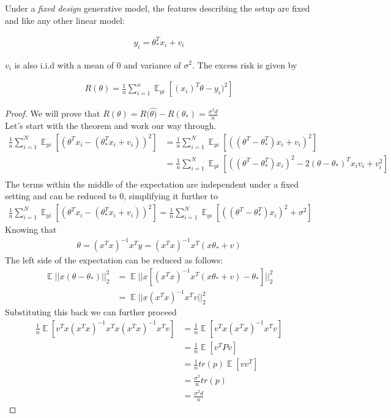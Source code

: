 Under a \textit{fixed design} generative model, the features describing the setup are fixed and like any other linear model:
\begin{theorem}
\begin{align*} 
y_{i} = \theta_{*}^{T}x_{i} + v_{i}
\end{align*}
\end{theorem}
$v_{i}$ is also i.i.d with a mean of $0$ and variance of $\sigma^{2}$. The excess risk is given by
\begin{theorem}
\begin{align*} 
R(\theta) = \frac{1}{n} \sum_{i=1}^{n}\mathop{{}\mathbb{E}}_{yi} [(x_{i})^{T}\theta - y_{i})^{2}]
\end{align*}
\end{theorem}
\begin{proof} We will prove that $R(\theta) = R(\hat{\theta)} - R(\theta_{*}) = \frac{\sigma^{2}d}{n}$ \\
Let's start with the theorem and work our way through. \\
\begin{align*}
\frac{1}{n}\sum_{i=1}^{N}\mathop{{}\mathbb{E}}_{yi}[(\theta^{T}x_{i} - (\theta_{*}^{T}x_{i}+v_{i}))^{2}] &= \frac{1}{n}\sum_{i=1}^{N}\mathop{{}\mathbb{E}}_{yi}[((\theta^{T} - \theta_{*}^{T})x_{i}+v_{i})^{2}] \\
&= \frac{1}{n}\sum_{i=1}^{N}\mathop{{}\mathbb{E}}_{yi}[((\theta^{T} - \theta_{*}^{T})x_{i})^{2}-2(\theta - \theta_{*})^{T}x_{i}v_{i}+v_{i}^{2}] \\
\end{align*}
The terms within the middle of the expectation are independent under a fixed setting and can be reduced to $0$, simplifying it further to \\
\begin{align*}
 \frac{1}{n}\sum_{i=1}^{N}\mathop{{}\mathbb{E}}_{yi}[(\theta^{T}x_{i} - (\theta_{*}^{T}x_{i}+v_{i}))^{2}] = \frac{1}{n}\sum_{i=1}^{N}\mathop{{}\mathbb{E}}_{yi}[((\theta^{T} - \theta_{*}^{T})x_{i})^{2}+\sigma^{2}] 
\end{align*}
Knowing that 
\begin{align*}
    \theta = (x^{T}x)^{-1}x^{T}y = (x^{T}x)^{-1}x^{T}(x\theta_{*}+v)
\end{align*}
The left side of the expectation can be reduced as follows:
\begin{align*}
\mathop{{}\mathbb{E}}||x(\theta-\theta_{*})||_{2}^{2} &=\mathop{{}\mathbb{E}}||x[(x^{T}x)^{-1}x^{T}(x\theta_{*}+v)-\theta_{*}]||_{2}^{2} \\
&=\mathop{{}\mathbb{E}}||x(x^{T}x)^{-1}x^{T}v||_{2}^{2}
\end{align*}
Substituting this back we can further proceed
\begin{align*}
\frac{1}{n}\mathop{{}\mathbb{E}}[v^{T}x(x^{T}x)^{-1}x^{T}x(x^{T}x)^{-1}x^{T}v] &= \frac{1}{n}\mathop{{}\mathbb{E}}[v^{T}x(x^{T}x)^{-1}x^{T}v] \\ 
&= \frac{1}{n}\mathop{{}\mathbb{E}}[v^{T}Pv] \\
&= \frac{1}{n}tr(p)\mathop{{}\mathbb{E}}[vv^{T}] \\ 
&= \frac{\sigma^{2}}{n}tr(p) \\
&= \frac{\sigma^{2}d}{n}
\end{align*}
\end{proof}
